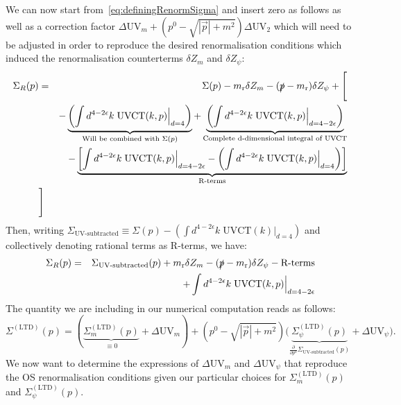 \documentclass[11pt]{article}
\begin{document}
We can now start from~\eqref{eq:definingRenormSigma} and insert zero as follows as well as a correction factor $\Delta \textrm{UV}_m + (p^0-\sqrt{|\vec{p}|+m^2})\Delta \textrm{UV}_2$ which will need to be adjusted in order to reproduce the desired renormalisation conditions which induced the renormalisation counterterms $\delta Z_m$ and $\delta Z_\psi$:
\begin{eqnarray}
\Sigma_R(p)&=&\Sigma(p)-m_\text{r} \delta Z_m - (\slashed p - m_\text{r})\delta Z_\psi +  {\Bigg [ } \label{eq:UVCTdefa}\\
&&
-\underbrace{\left( \int d^{4-2\epsilon}k\; \textrm{UVCT}(k,p){\Big |}_{d=4} \right)}_{\textrm{Will be combined with $\Sigma(p)$}} 
+ \underbrace{\left( \int d^{4-2\epsilon}k\; \textrm{UVCT}(k,p){\Big |}_{d=4-2\epsilon} \right)}_{\textrm{Complete d-dimensional integral of UVCT}}
 \label{eq:UVCTdefb}\\
&&- 
\underbrace{\left [ 
\int d^{4-2\epsilon}k\; \textrm{UVCT}(k,p){\Big |}_{d=4-2\epsilon} -  \left( \int d^{4-2\epsilon}k\; \textrm{UVCT}(k,p){\Big |}_{d=4} \right) \label{eq:UVCTdefc} 
\right ]}_{\textrm{R-terms}} \\
&{\Bigg ] }&
\end{eqnarray}
Then, writing $\Sigma_{\textrm{UV-subtracted}}\equiv \Sigma(p)-\left( \int d^{4-2\epsilon}k\; \textrm{UVCT}(k){\Big |}_{d=4} \right)$ and collectively denoting rational terms as R-terms, we have:
\begin{eqnarray}
\Sigma_R(p)&=&\Sigma_{\textrm{UV-subtracted}}(p)+m_\text{r} \delta Z_m - (\slashed p - m_\text{r})\delta Z_\psi -\textrm{R-terms} \nonumber\\
&&
+ \int d^{4-2\epsilon}k\; \textrm{UVCT}(k,p){\Big |}_{d=4-2\epsilon} 
 \label{eq:SigmaRenormalaLTD}
\end{eqnarray}
The quantity we are including in our numerical computation reads as follows:
\begin{equation}
\Sigma^{(\textrm{LTD})}(p) = \left( 
\underbrace{\Sigma^{(\textrm{LTD})}_{m} (p)}_{
\equiv 0
}
+ \Delta \textrm{UV}_m \right) 
+ (p^0-\sqrt{|\vec{p}|+m^2}) {\Big(}
\underbrace{
\Sigma^{(\textrm{LTD})}_{\psi} (p)
}_{
\frac{\partial}{\partial p^0} \Sigma_{\textrm{UV-subtracted}}(p)
}
+ \Delta \textrm{UV}_\psi {\Big)}.
\end{equation}
We now want to determine the expressions of $\Delta \textrm{UV}_m$ and $\Delta \textrm{UV}_\psi$ that reproduce the OS renormalisation conditions given our particular choices for $\Sigma^{(\textrm{LTD})}_{m} (p)$ and $\Sigma^{(\textrm{LTD})}_{\psi} (p)$.
\end{document}
